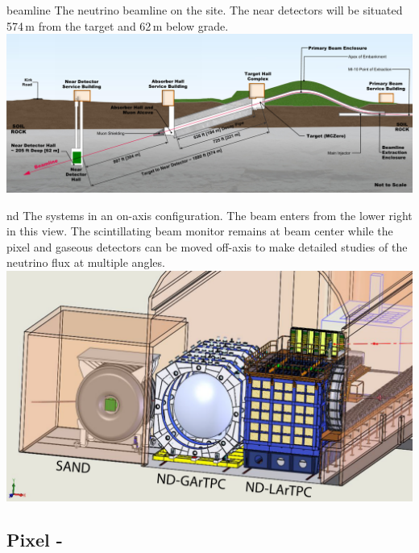 \documentclass[../main-v1.tex]{subfiles}
\begin{document}
 \begin{dunefigure}
{beamline} %
{The neutrino beamline on the  site. The near detectors will be situated 574\,m from the target and 62\,m below grade.}
\includegraphics[height=0.3\textwidth]{graphics/IntroFigures/beamline-sideview.png}
\end{dunefigure}

 
 \begin{dunefigure}
{nd}
{The  systems in an on-axis configuration.  The beam enters from the lower right in this view. The  scintillating beam monitor remains at beam center while the pixel %
 and gaseous   detectors can be moved off-axis to make detailed studies of the neutrino flux at multiple angles.}
\includegraphics[height=0.5\textwidth]{graphics/IntroFigures/All3Detectors.pdf}
\end{dunefigure}

 \subsection{Pixel  -  }
 
\end{document}
